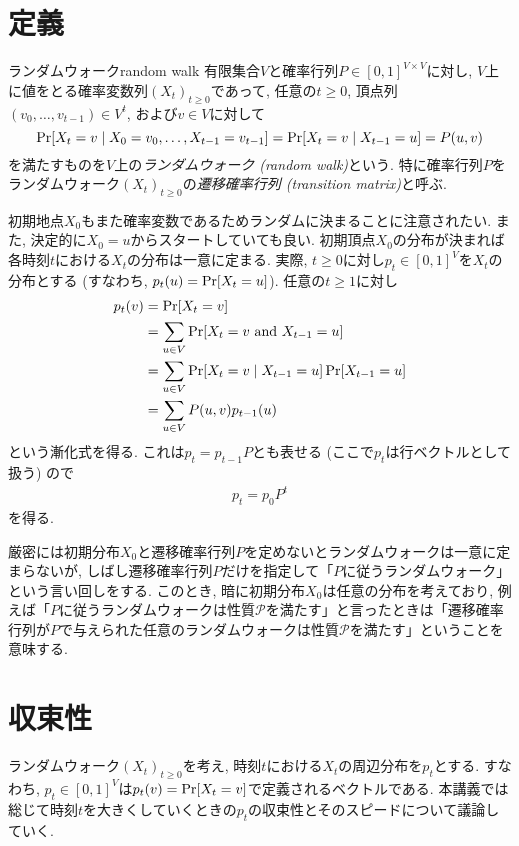 \section{定義}
%
\begin{definition}{ランダムウォーク}{random walk}
  有限集合$V$と確率行列$P\in[0,1]^{V\times V}$に対し,
  $V$上に値をとる確率変数列$(X_t)_{t\ge 0}$であって, 任意の$t\ge 0$, 頂点列$(v_0,\dots,v_{t-1})\in V^t$,
  および$v\in V$に対して
  \[
    \Pr\sbra*{X_t = v \condition X_0 = v_0,\dots,X_{t-1} = v_{t-1}} = \Pr\sbra*{X_t = v \condition X_{t-1} = u} = P(u,v)
  \]
  を満たすものを$V$上の\emph{ランダムウォーク (random walk)}という.
  特に確率行列$P$をランダムウォーク$(X_t)_{t\ge 0}$の\emph{遷移確率行列 (transition matrix)}と呼ぶ.
\end{definition}
%
初期地点$X_0$もまた確率変数であるためランダムに決まることに注意されたい.
また, 決定的に$X_0=u$からスタートしていても良い.
%
初期頂点$X_0$の分布が決まれば各時刻$t$における$X_t$の分布は一意に定まる.
実際, $t\ge 0$に対し$p_t \in [0,1]^{V}$を$X_t$の分布とする
(すなわち, $p_t(u) = \Pr\sbra*{X_t = u}$).
任意の$t\ge 1$に対し
\begin{align*}
  p_t(v) & = \Pr\sbra*{X_t = v}                                                             \\
         & = \sum_{u\in V}\Pr\sbra*{ X_t = v \tand X_{t-1} = u}                             \\
         & = \sum_{u\in V}\Pr\sbra*{ X_t = v \condition X_{t-1} = u} \Pr\sbra*{X_{t-1} = u} \\
         & = \sum_{u\in V} P(u,v) p_{t-1}(u)
\end{align*}
という漸化式を得る.
これは$p_{t} = p_{t-1} P$とも表せる (ここで$p_t$は行ベクトルとして扱う) ので
\begin{align}
  p_t = p_0 P^t \label{eq:p_t}
\end{align}
を得る.

厳密には初期分布$X_0$と遷移確率行列$P$を定めないとランダムウォークは一意に定まらないが,
しばし遷移確率行列$P$だけを指定して「$P$に従うランダムウォーク」という言い回しをする.
このとき, 暗に初期分布$X_0$は任意の分布を考えており, 例えば「$P$に従うランダムウォークは性質$\mathcal{P}$を満たす」と言ったときは「遷移確率行列が$P$で与えられた任意のランダムウォークは性質$\mathcal{P}$を満たす」ということを意味する.

\section{収束性}
ランダムウォーク$(X_t)_{t\ge 0}$を考え, 時刻$t$における$X_t$の周辺分布を$p_t$とする.
すなわち, $p_t \in [0,1]^V$は$p_t(v) = \Pr\lbrack X_t = v\rbrack$で定義されるベクトルである.
本講義では総じて時刻$t$を大きくしていくときの$p_t$の収束性とそのスピードについて議論していく.


